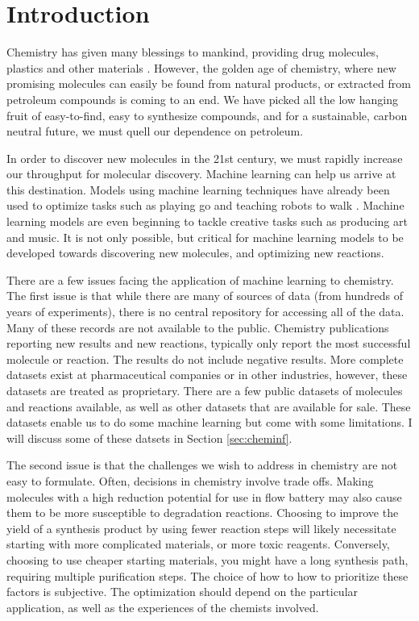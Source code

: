 \chapter{Introduction}
\thispagestyle{plain}

Chemistry has given many blessings to mankind, providing drug molecules, plastics and other materials \cite{napoleons_buttons}. However, the golden age of chemistry, where new promising molecules can easily be found from natural products, or extracted from petroleum compounds is coming to an end. We have picked all the low hanging fruit of easy-to-find, easy to synthesize compounds, and for a sustainable, carbon neutral future, we must quell our dependence on petroleum.

In order to discover new molecules in the 21st century, we must rapidly increase our throughput for molecular discovery. Machine learning can help us arrive at this destination. Models using machine learning techniques have already been used to optimize tasks such as playing go and teaching robots to walk \cite{silver2016mastering,2017walkPavlov}. Machine learning models are even beginning to tackle creative tasks such as producing art and music. It is not only possible, but critical for machine learning models to be developed towards discovering new molecules, and optimizing new reactions.

There are a few issues facing the application of machine learning to chemistry. The first issue is that while there are many of sources of data (from hundreds of years of experiments), there is no central repository for accessing all of the data. Many of these records are not available to the public. Chemistry publications reporting new results and new reactions, typically only report the most successful molecule or reaction. The results do not include negative results. More complete datasets exist at pharmaceutical companies or in other industries, however, these datasets are treated as  proprietary. There are a few public datasets of molecules and reactions available, as well as other datasets that are available for sale. These datasets enable us to do some machine learning but come with some limitations. I will discuss some of these datsets in Section \ref{sec:cheminf}. 

The second issue is that the challenges we wish to address in chemistry are not easy to formulate. Often, decisions in chemistry involve trade offs. Making molecules with a high reduction potential for use in flow battery may also cause them to be more susceptible to degradation reactions\cite{tabor_2018}. Choosing to improve the yield of a synthesis product by using fewer reaction steps will likely necessitate starting with more complicated materials, or more toxic reagents. Conversely, choosing to use cheaper starting materials, you might have a long synthesis path, requiring multiple purification steps. The choice of how to how to prioritize these factors is subjective. The optimization should depend on the particular application, as well as the experiences of the chemists involved.

